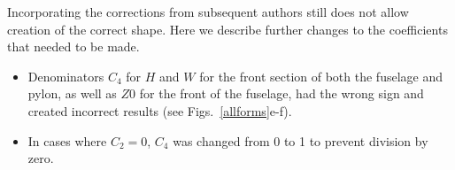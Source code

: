 \documentclass[journal]{new-aiaa}
\begin{document}

Incorporating the corrections from subsequent authors still does not allow creation of the correct shape.
Here we describe further changes to the coefficients that needed to be made.
\begin{itemize}
\item Denominators $C_{4}$ for $H$ and $W$ for the front section of both the fuselage and pylon, as well as $Z0$ for the
front of the fuselage, had the wrong sign and created incorrect results (see Figs.~\ref{allforms}e-f).
\item In cases where $C_{2}=0$, $C_{4}$ was changed from 0 to 1 to prevent division by zero.%
\end{itemize}

\end{document}
